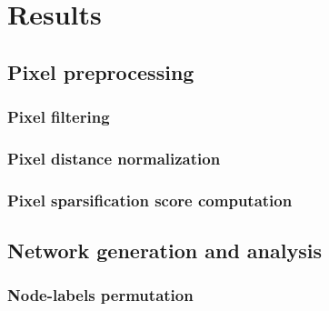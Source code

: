 \graphicspath{{chapters/05_results/images}}
\chapter{Results}


\section{Pixel preprocessing}

\subsection{Pixel filtering}

\subsection{Pixel distance normalization}

\subsection{Pixel sparsification score computation}



\section{Network generation and analysis}

\subsection{Node-labels permutation}


